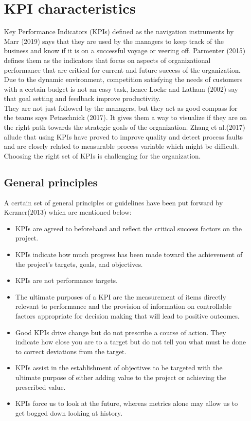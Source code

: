 \section{KPI characteristics}
Key Performance Indicators (KPIs) defined as the navigation instruments by Marr (2019) says that they are used by the managers to keep track of the business and know if it is on a successful voyage or veering off. Parmenter (2015) defines them as the indicators that focus on aspects of organizational performance that are critical for current and future success of the organization. Due to the dynamic environment, competition satisfying the needs of customers with a certain budget is not an easy task, hence Locke and Latham (2002) say that goal setting and feedback improve productivity.\\

They are not just followed by the managers, but they act as good compass for the teams says Petaschnick (2017).  It gives them a way to visualize if they are on the right path towards the strategic goals of the organization. Zhang et al.(2017) allude that using KPIs have proved to improve quality and detect process faults and are closely related to measurable process variable which might be difficult. Choosing the right set of KPIs is challenging for the organization.\\

\subsection{General principles}
A certain set of general principles or guidelines have been put forward by Kerzner(2013) which are mentioned below:\\

\begin{itemize}
    \item KPIs are agreed to beforehand and reflect the critical success factors on the project. 
    \item KPIs indicate how much progress has been made toward the achievement of the project’s targets, goals, and objectives. 
    \item KPIs are not performance targets. 
    \item The ultimate purposes of a KPI are the measurement of items directly relevant to performance and the provision of information on controllable factors appropriate for decision making that will lead to positive outcomes. 
    \item Good KPIs drive change but do not prescribe a course of action. They indicate how close you are to a target but do not tell you what must be done to correct deviations from the target. 
    \item KPIs assist in the establishment of objectives to be targeted with the ultimate purpose of either adding value to the project or achieving the prescribed value. 
    \item KPIs force us to look at the future, whereas metrics alone may allow us to get bogged down looking at history. \\ 
\end{itemize}


